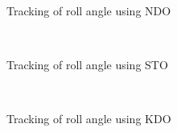 \documentclass[letterpaper%
, twoside%
, 12pt%
,memoire%
, english%
,creativecommons,hyperref%
]{thETS}
\begin{document}
\begin{figure}[H]
\centering
{}
\\ \parbox{0.75\textwidth}{\caption{Tracking of roll angle using NDO}
\label{roll_trac_dis_m1_ndo}}
\end{figure}

\begin{figure}[H]
\centering
{}
\\ \parbox{0.75\textwidth}{\caption{Tracking of roll angle using STO}
\label{roll_trac_dis_m1_sto}}
\end{figure}

\begin{figure}[H]
\centering
{}
\\ \parbox{0.75\textwidth}{\caption{Tracking of roll angle using KDO}
\label{roll_trac_dis_m1_kdo}}
\end{figure}
\end{document}
